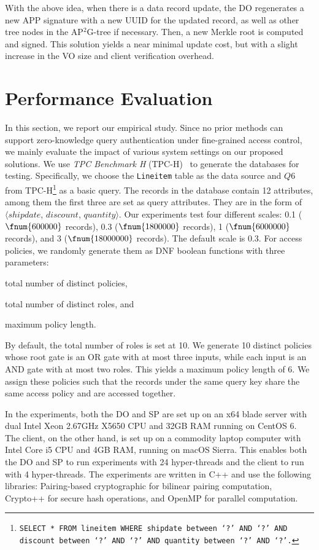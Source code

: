 With the above idea, when there is a data record update, the DO regenerates a new APP signature with a new UUID for the updated record, as well as other tree nodes in the AP$^2$G-tree if necessary. Then, a new Merkle root is computed and signed. This solution yields a near minimal update cost, but with a slight increase in the VO size and client verification overhead.

\section{Performance Evaluation}\label{sec:access-control:evluation}

In this section, we report our empirical study. Since no prior methods can support zero-knowledge query authentication under fine-grained access control, we mainly evaluate the impact of various system settings on our proposed solutions. We use \emph{TPC Benchmark H} (TPC-H)~\cite{tpch} to generate the databases for testing. Specifically, we choose the \verb+Lineitem+ table as the data source and $Q$6 from TPC-H\footnote{\texttt{SELECT * FROM lineitem WHERE shipdate between `?' AND `?' AND discount between `?' AND `?' AND quantity between `?' AND `?'.}} as a basic query. The records in the database contain 12 attributes, among them the first three are set as query attributes. They are in the form of $\langle shipdate$, $discount$, $quantity\rangle$. Our experiments test four different scales:
0.1 ($\fnum{600000}$ records), 0.3 ($\fnum{1800000}$ records), 1 ($\fnum{6000000}$ records), and 3 ($\fnum{18000000}$ records).
The default scale is 0.3. For access policies, we randomly generate them as DNF boolean functions with three parameters:
\begin{inlineenum}
    \item  total number of distinct policies,
    \item  total number of distinct roles, and
    \item  maximum policy length.
\end{inlineenum}
By default, the total number of roles is set at 10. We generate 10 distinct policies whose root gate is an OR gate with at most three inputs, while each input is an AND gate with at most two roles. This yields a maximum policy length of 6.
We assign these policies such that the records under the same query key share the same access policy and are accessed together.

In the experiments, both the DO and SP are set up on an x64 blade server with dual Intel Xeon 2.67GHz X5650 CPU and 32GB RAM running on CentOS 6. The client, on the other hand, is set up on a commodity laptop computer with Intel Core i5 CPU and 4GB RAM, running on macOS Sierra. This enables both the DO and SP to run experiments with 24 hyper-threads and the client to run with 4 hyper-threads. The experiments are written in C++ and use the following libraries: Pairing-based cryptographic for bilinear pairing computation, Crypto++ for secure hash operations, and OpenMP for parallel computation.

